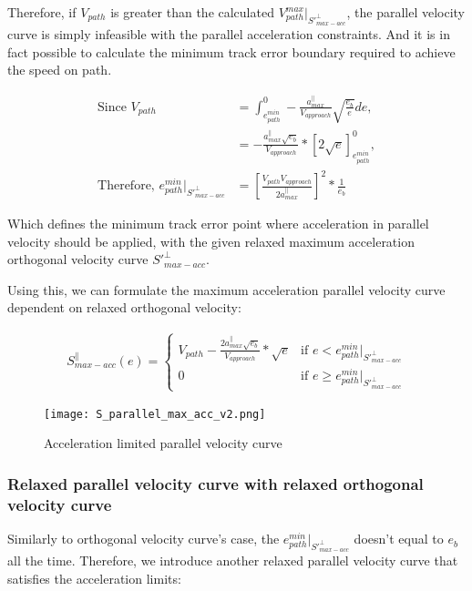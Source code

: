 Therefore, if $V_{path}$ is greater than the calculated $V_{path}^{max} |_{S'^{\perp}_{max-acc}}$, the parallel velocity curve is simply infeasible with the parallel acceleration constraints. And it is in fact possible to calculate the minimum track error boundary required to achieve the speed on path.

\begin{equation}
\begin{split}
    \text{Since } V_{path} &= \int_{e^{min}_{path}}^{0}-\frac{a^{\parallel}_{max}}{V_{approach}}\sqrt{\frac{e_b}{e}}de,\\
    &= -\frac{a^{\parallel}_{max}\sqrt{e_b}}{V_{approach}} * [2\sqrt{e}]^{0}_{e^{min}_{path}},\\
    \text{Therefore, } e^{min}_{path}|_{S'^{\perp}_{max-acc}} &= [\frac{V_{path}V_{approach}}{2a^{\parallel}_{max}}]^2*\frac{1}{e_b}
\end{split}
\end{equation}

Which defines the minimum track error point where acceleration in parallel velocity should be applied, with the given relaxed maximum acceleration orthogonal velocity curve $S'^{\perp}_{max-acc}$.\newline

Using this, we can formulate the maximum acceleration parallel velocity curve dependent on relaxed orthogonal velocity:

\begin{align}
    S^{\parallel}_{max-acc}(e)=\begin{cases}
        V_{path} - \frac{2a^{\parallel}_{max}\sqrt{e_b}}{V_{approach}} * \sqrt{e}& \text{if $e < e^{min}_{path}|_{S'^{\perp}_{max-acc}}$}\\
        0& \text{if $e \geq e^{min}_{path}|_{S'^{\perp}_{max-acc}}$}
    \end{cases}
    \label{eq:s_orth_max_acc}
\end{align}

\begin{figure}[h]
\centering
\texttt{[image: S\_parallel\_max\_acc\_v2.png]}
\caption{\label{fig:acc_limited_parallel_vel}Acceleration limited parallel velocity curve}
\end{figure}

\subsubsection{Relaxed parallel velocity curve with relaxed orthogonal velocity curve}
Similarly to orthogonal velocity curve's case, the $e^{min}_{path}|_{S'^{\perp}_{max-acc}}$ doesn't equal to $e_b$ all the time. Therefore, we introduce another relaxed parallel velocity curve that satisfies the acceleration limits:

